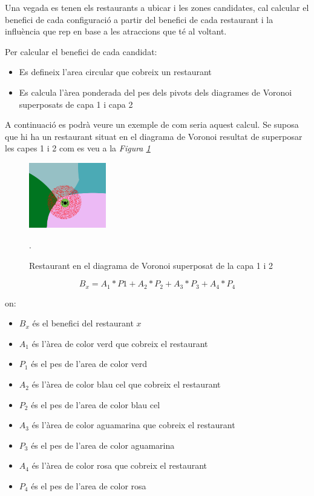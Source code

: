 \documentclass[12pt]{article}
\begin{document}
Una vegada es tenen els restaurants a ubicar i les zones candidates, cal calcular el benefici de cada configuració a partir del benefici de cada restaurant i la influència que rep en base a les atraccions que té al voltant.  

Per calcular el benefici de cada candidat:
\begin{itemize}
	\item Es defineix l'area circular que cobreix un restaurant
	\item Es calcula l'àrea ponderada del pes dels pivots dels diagrames de Voronoi superposats de capa 1 i capa 2
\end{itemize}

A continuació es podrà veure un exemple de com seria aquest calcul. Se suposa que hi ha un restaurant situat en el diagrama de Voronoi resultat de superposar les capes 1 i 2 com es veu a la \textit{Figura \ref{fig:benefici_restaurant}}

\begin{figure}[H]
	\centering
	\includegraphics[width=0.3\textwidth]{imatges/benefici_restaurant.png}\par\vspace{1cm}
	\caption{Restaurant en el diagrama de Voronoi superposat de la capa 1 i 2}.
	\label{fig:benefici_restaurant}
\end{figure}

$$B_{x} = A_{1}*P{1} + A_{2}*P_{2} + A_{3}*P_{3} + A_{4}*P_{4}$$

on:

\begin{itemize}
	\item $B_{x}$ és el benefici del restaurant $x$
	\item $A_{1}$ és l'àrea de color verd que cobreix el restaurant
	\item $P_{1}$ és el pes de l'area de color verd 
	\item $A_{2}$ és l'àrea de color blau cel que cobreix el restaurant
	\item $P_{2}$ és el pes de l'area de color blau cel 
	\item $A_{3}$ és l'àrea de color aguamarina que cobreix el restaurant
	\item $P_{3}$ és el pes de l'area de color aguamarina 
	\item $A_{4}$ és l'àrea de color rosa que cobreix el restaurant
	\item $P_{4}$ és el pes de l'area de color rosa 
\end{itemize}
\end{document}
